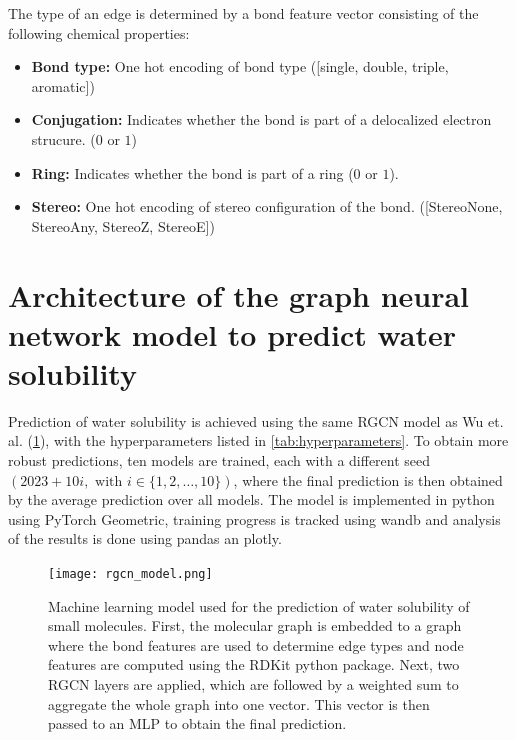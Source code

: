 The type of an edge is determined by a bond feature vector consisting of the following chemical properties:


\begin{itemize}
    \item \textbf{Bond type:} One hot encoding of bond type ([single, double, triple, aromatic])
    \item \textbf{Conjugation:} Indicates whether the bond is part of a delocalized electron strucure.
        ($0$ or $1$) 
    \item \textbf{Ring:} Indicates whether the bond is part of a ring ($0$ or $1$).
    \item \textbf{Stereo:} One hot encoding of stereo configuration of the bond.
        ([StereoNone, StereoAny, StereoZ, StereoE])
\end{itemize}


\section{Architecture of the graph neural network model to predict water solubility}


Prediction of water solubility is achieved using the same RGCN model as Wu et. al. (\cref{fig:ml_model}),
with the hyperparameters listed in \cref{tab:hyperparameters}. To obtain more 
robust predictions, ten models are trained, each with a different seed 
$(2023 + 10i, \text{ with } i \in \{1, 2, \dots, 10\})$, where the final 
prediction is then obtained by the average prediction over all models.\cite{wu2023chemistry} 
The model is implemented in python using PyTorch Geometric\cite{Fey/Lenssen/2019}, training progress 
is tracked using wandb\cite{wandb} and analysis of the results is done using 
pandas\cite{reback2020pandas} an plotly\cite{plotly}.


\begin{figure}[h]
    \centering
    \texttt{[image: rgcn\_model.png]}
    \caption{Machine learning model used for the prediction of water solubility of 
        small molecules. First, the molecular graph is embedded to a graph where the 
        bond features are used to determine edge types and node features are computed 
        using the RDKit python package. Next, two RGCN layers are applied, which are 
        followed by a weighted sum to aggregate the whole graph into one vector. This 
        vector is then passed to an MLP to obtain the final prediction.
    }
    \label{fig:ml_model}
\end{figure}


